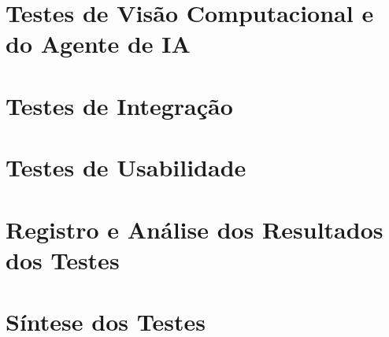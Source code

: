 
\section{Testes de Visão Computacional e do Agente de IA}
\label{sec:testes-visao-ia}


\section{Testes de Integração}
\label{sec:testes-integracao}


\section{Testes de Usabilidade}
\label{sec:testes-usabilidade}


\section{Registro e Análise dos Resultados dos Testes}
\label{sec:registro-resultados-testes}



\section{Síntese dos Testes}
\label{sec:sintese-testes}


